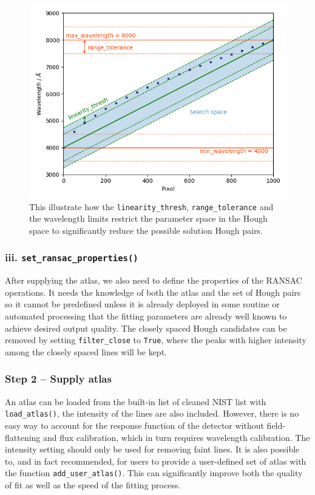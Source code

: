 \documentclass{aa}
\begin{document}
\begin{figure}[h]
    \centering
    \includegraphics[width=\columnwidth]{plots/figure_1_threshold_plot.png}
    \caption{This illustrate how the \texttt{linearity\_thresh},
    \texttt{range\_tolerance} and the wavelength limits restrict the parameter
    space in the Hough space to significantly reduce the possible solution Hough
    pairs.}
    \label{fig:threshold}
\end{figure}

\subsubsection*{iii. \texttt{set\_ransac\_properties()}}
After supplying the atlas, we also need to define the properties of the RANSAC
operations. It needs the knowledge of both the atlas and the set of Hough pairs
so it cannot be predefined unless it is already deployed in some routine or
automated processing that the fitting parameters are already well known to
achieve desired output quality. The closely spaced Hough candidates can be
removed by setting \texttt{filter\_close} to \texttt{True}, where the peaks with
higher intensity among the closely spaced lines will be kept.

\subsubsection*{Step 2 -- Supply atlas}
An atlas can be loaded from the built-in list of cleaned NIST list with
\texttt{load\_atlas()}, the intensity of the lines are also included.
However, there is no easy way to account for the response function of
the detector without field-flattening and flux calibration, which in turn
requires wavelength calibration. The intensity setting should only be
used for removing faint lines. It is also possible to, and in fact
recommended, for users to provide a user-defined set of atlas with the
function \texttt{add\_user\_atlas()}. This can significantly improve
both the quality of fit as well as the speed of the fitting process.
\end{document}
